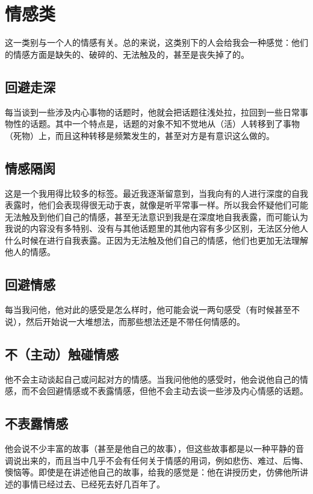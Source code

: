 \section*{情感类}

这一类别与一个人的情感有关。总的来说，这类别下的人会给我会一种感觉：他们的情感方面是缺失的、破碎的、无法触及的，甚至是丧失掉了的。

\subsection*{回避走深}

每当谈到一些涉及内心事物的话题时，他就会把话题往浅处拉，拉回到一些日常事物性的话题。其中一个特点是，话题的对象不知不觉地从（活）人转移到了事物（死物）上，而且这种转移是频繁发生的，甚至对方是有意识这么做的。

\subsection*{情感隔阂}

这是一个我用得比较多的标签。最近我逐渐留意到，当我向有的人进行深度的自我表露时，他们会表现得很无动于衷，就像是听平常事一样。所以我会怀疑他们可能无法触及到他们自己的情感，甚至无法意识到我是在深度地自我表露，而可能认为我说的内容没有多特别、没有与其他话题里的其他内容有多少区别，无法区分他人什么时候在进行自我表露。正因为无法触及他们自己的情感，他们也更加无法理解他人的情感。

\subsection*{回避情感}

每当我问他，他对此的感受是怎么样时，他可能会说一两句感受（有时候甚至不说），然后开始说一大堆想法，而那些想法还是不带任何情感的。

\subsection*{不（主动）触碰情感}

他不会主动谈起自己或问起对方的情感。当我问他他的感受时，他会说他自己的情感，而不会回避情感或不表露情感，但他不会主动去谈一些涉及内心情感的话题。

\subsection*{不表露情感}

他会说不少丰富的故事（甚至是他自己的故事），但这些故事都是以一种平静的音调说出来的，而且当中几乎不会有任何关于情感的用词，例如悲伤、难过、后悔、懊恼等。即使是在讲述他自己的故事，给我的感觉是：他在讲授历史，仿佛他所讲述的事情已经过去、已经死去好几百年了。


